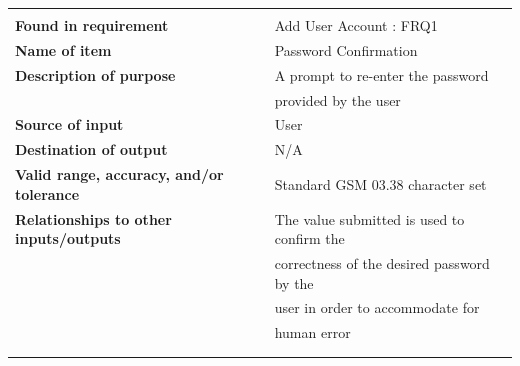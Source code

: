 \begin{tabular}{ll}
&\\
\textbf{Found in requirement}&Add User Account : FRQ1\\
\textbf{Name of item}&Password Confirmation\\
\textbf{Description of purpose}&A prompt to re-enter the password\\& provided by the user\\
\textbf{Source of input}&User\\
\textbf{Destination of output}&N/A\\
\textbf{Valid range, accuracy, and/or tolerance}&Standard GSM 03.38 character set\\
\textbf{Relationships to other inputs/outputs}&The value submitted is used to confirm the\\& correctness of the desired password by the \\&user in order to accommodate for\\& human error\\
&\\
&\\
\end{tabular}
\newpage
